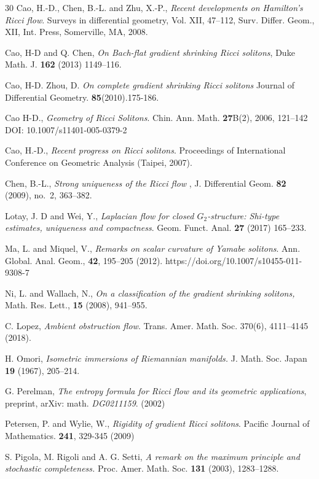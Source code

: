 \documentclass{amsart}
\theoremstyle{plain}
\numberwithin{equation}{section}
\begin{document}
\begin{thebibliography}{30}
Cao, H.-D., Chen, B.-L. and Zhu, X.-P., {\em Recent developments on Hamilton’s Ricci flow}.
Surveys in differential geometry, Vol. XII, 47–112, Surv. Differ. Geom., XII, Int. Press,
Somerville, MA, 2008.

Cao, H-D and Q. Chen, {\em On Bach-flat gradient shrinking Ricci solitons}, Duke Math. J. \textbf{162} (2013) 1149--116.

Cao, H-D. Zhou, D. \textit{On complete gradient shrinking Ricci solitons
} Journal of Differential Geometry. \textbf{85}(2010).175-186.

Cao H-D., {\em Geometry of Ricci Solitons}.  Chin. Ann. Math.
\textbf{27}B(2), 2006, 121--142
DOI: 10.1007/s11401-005-0379-2

Cao, H.-D., {\em Recent progress on Ricci solitons}. Proceedings of International
Conference on Geometric Analysis (Taipei, 2007).

Chen, B.-L., {\em Strong uniqueness of the Ricci flow} , J. Differential Geom. {\bf 82} (2009), no.~2, 363--382.

 Lotay, J. D and Wei, Y., {\em Laplacian flow for closed $G_2$-structure: Shi-type estimates, uniqueness and compactness}. Geom. Funct. Anal. \textbf{27}  (2017) 165–233.

Ma, L. and Miquel, V., {\em Remarks on scalar curvature of Yamabe solitons}. Ann. Global. Anal. Geom., \textbf{42}, 195–205 (2012). https://doi.org/10.1007/s10455-011-9308-7

Ni, L. and Wallach, N., {\em On a classification of the gradient shrinking solitons,} Math. Res.
Lett., \textbf{15} (2008), 941–955.

C. Lopez,  {\em Ambient obstruction flow}. Trans. Amer. Math. Soc. 370(6), 4111--4145 (2018).


 H. Omori, {\em Isometric immersions of Riemannian manifolds.} J. Math. Soc. Japan \textbf{19} (1967),
205--214.

 G. Perelman, {\em The entropy formula for Ricci flow and its geometric applications}, preprint, arXiv: math. {\em DG0211159}. (2002)

Petersen, P. and Wylie, W.,  {\em Rigidity of gradient Ricci solitons}. Pacific Journal of Mathematics. \textbf{241}, 329-345 (2009)

S. Pigola, M. Rigoli and A. G. Setti, {\em A remark on the maximum principle and stochastic
completeness.} Proc. Amer. Math. Soc. \textbf{131} (2003), 1283--1288.


\end{thebibliography}
\end{document}
